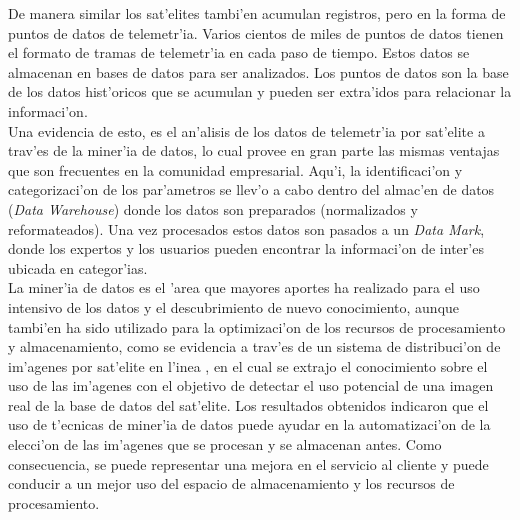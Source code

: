 De manera similar los sat'elites tambi'en acumulan registros, pero en la forma de puntos de datos de telemetr'ia. Varios cientos de miles de puntos de datos tienen el formato de tramas de telemetr'ia en cada paso de tiempo. Estos datos se almacenan en bases de datos para ser analizados. Los puntos de datos son la base de los datos hist'oricos que se acumulan y pueden ser extra'idos para relacionar la informaci'on.\\

Una evidencia de esto, es el an'alisis de los datos de telemetr'ia\cite{self_use_2000} por sat'elite a trav'es de la miner'ia de datos, lo cual provee en gran parte las mismas ventajas que son frecuentes en la comunidad empresarial. Aqu'i, la identificaci'on y categorizaci'on de los par'ametros se llev'o a cabo dentro del almac'en de datos (\emph{Data Warehouse}) donde los datos son preparados (normalizados y reformateados). Una vez procesados estos datos son pasados a un \emph{Data Mark}, donde los expertos y los usuarios pueden encontrar la informaci'on de inter'es ubicada en categor'ias.\\

La miner'ia de datos es el 'area que mayores aportes ha realizado para el uso intensivo de los datos y el descubrimiento de nuevo conocimiento, aunque tambi'en ha sido utilizado para la optimizaci'on de los recursos de procesamiento y almacenamiento, como se evidencia a trav'es de un sistema de distribuci'on de im'agenes por sat'elite en l'inea \cite{azevedo_application_2007}, en el cual se extrajo el conocimiento sobre el uso de las im'agenes con el objetivo de detectar el uso potencial de una imagen real de la base de datos del sat'elite. Los resultados obtenidos indicaron que el uso de t'ecnicas de miner'ia de datos puede ayudar en la automatizaci'on de la elecci'on de las im'agenes que se procesan y se almacenan antes. Como consecuencia, se puede representar una mejora en el servicio al cliente y puede conducir a un mejor uso del espacio de almacenamiento y los recursos de procesamiento.\\

